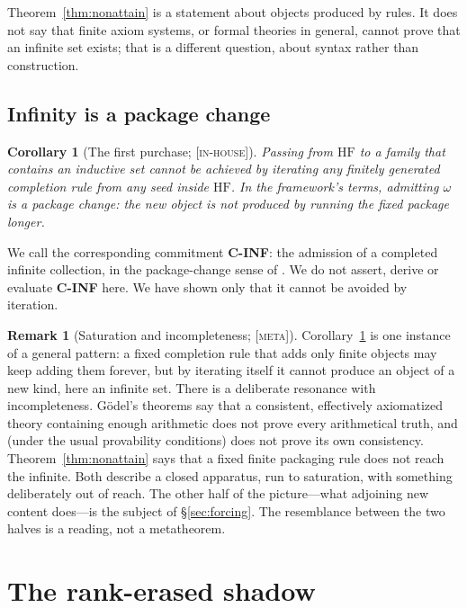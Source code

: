 \documentclass[11pt]{article}
\newcommand{\HF}{\mathrm{HF}}                 \newcommand{\rank}{\operatorname{rank}}
\newcommand{\gradetag}[1]{\textnormal{\textsc{[#1]}}}
\newcommand{\inhouse}{\gradetag{in-house}}
\newcommand{\metag}{\gradetag{meta}}
\newtheorem{corollary}[theorem]{Corollary}
\theoremstyle{definition}
\newtheorem{remark}[theorem]{Remark}
\begin{document}
Theorem~\ref{thm:nonattain} is a statement about objects produced by rules. It does not say that
finite axiom systems, or formal theories in general, cannot prove that an infinite set exists;
that is a different question, about syntax rather than construction.

\subsection{Infinity is a package change}

\begin{corollary}[The first purchase; \inhouse]\label{cor:packagechange}
Passing from $\HF$ to a family that contains an inductive set cannot be achieved by iterating any
finitely generated completion rule from any seed inside $\HF$. In the framework's terms, admitting
$\omega$ is a \emph{package change}: the new object is not produced by running the fixed package
longer.
\end{corollary}

We call the corresponding commitment \textbf{C-INF}: the admission of a completed infinite
collection, in the package-change sense of \citet{SBTIncompleteness}. We do not assert, derive
or evaluate \textbf{C-INF} here. We have shown only that it cannot be avoided by iteration.

\begin{remark}[Saturation and incompleteness; \metag]\label{rem:saturation}
Corollary~\ref{cor:packagechange} is one instance of a general pattern: a fixed completion rule
that adds only finite objects may keep adding them forever, but by iterating itself it cannot
produce an object of a new kind, here an infinite set. There
is a deliberate resonance with incompleteness. G\"odel's theorems \citep{Godel1931} say that a
consistent, effectively axiomatized theory containing enough arithmetic does not prove every
arithmetical truth, and (under the usual provability conditions) does not prove its own
consistency. Theorem~\ref{thm:nonattain} says that a fixed finite packaging rule does not reach
the infinite. Both describe a closed apparatus, run to saturation, with something deliberately out
of reach. The other half of the picture---what adjoining new content does---is the subject of
\S\ref{sec:forcing}. The resemblance between the two halves is a reading, not a metatheorem.
\end{remark}
 \section{The rank-erased shadow}\label{sec:shadow}
\end{document}
